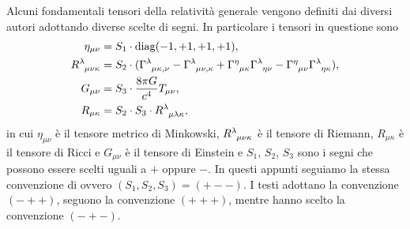 Alcuni fondamentali tensori della relatività generale vengono definiti dai
diversi autori adottando diverse scelte di segni.  In particolare i tensori in
questione sono
\begin{subequations}
  \label{eq:convenzione-segni}
  \begin{align}
    \eta_{\mu\nu} &= S_{1} \cdot \diag(-1,+1,+1,+1), \\
    \tensor{R}{^{\lambda}_{\mu\nu\kappa}} &= S_{2} \cdot
    (\tensor{\Gamma}{^{\lambda}_{\mu\kappa,\nu}} -
    \tensor{\Gamma}{^{\lambda}_{\mu\nu,\kappa}} +
    \tensor{\Gamma}{^{\eta}_{\mu\kappa}} \tensor{\Gamma}{^{\lambda}_{\eta\nu}} -
    \tensor{\Gamma}{^{\eta}_{\mu\nu}}
    \tensor{\Gamma}{^{\lambda}_{\eta\kappa}}), \\
    G_{\mu\nu} &= S_{3} \cdot \frac{8\pi G}{c^{4}} T_{\mu\nu}, \\
    R_{\mu\kappa} &= S_{2} \cdot S_{3} \cdot
    \tensor{R}{^{\lambda}_{\mu\lambda\kappa}},
  \end{align}
\end{subequations}
in cui $\eta_{\mu\nu}$ è il tensore metrico di Minkowski,
$\tensor{R}{^{\lambda}_{\mu\nu\kappa}}$ è il tensore di Riemann, $R_{\mu\kappa}$
è il tensore di Ricci e $G_{\mu\nu}$ è il tensore di Einstein e $S_{1}$,
$S_{2}$, $S_{3}$ sono i segni che possono essere scelti uguali a $+$ oppure $-$.
In questi appunti seguiamo la stessa convenzione di
\textcite{weinberg:gravitation} ovvero $(S_{1}, S_{2}, S_{3}) = (+--)$.  I testi
\textcites{barone:relativita,landau:campi} adottano la convenzione $(-++)$,
\textcite{misner:gravitation} seguono la convenzione $(+++)$, mentre
\textcite{ohanian:gravitazione} hanno scelto la convenzione $(-+-)$.

